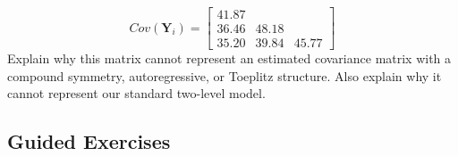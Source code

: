 \documentclass[
]{krantz}
\begin{document}
\begin{enumerate}
  \[ Cov(\mathbf{Y}_i) =  \left[
        \begin{array}{cccc}
          41.87 & &   \\
          36.46 & 48.18 &  \\
          35.20 & 39.84 & 45.77
        \end{array} \right] \]
  Explain why this matrix cannot represent an estimated covariance matrix with a compound symmetry, autoregressive, or Toeplitz structure. Also explain why it cannot represent our standard two-level model.
\end{enumerate}

\subsection{Guided Exercises}\label{guided-exercises-7}
\end{document}
